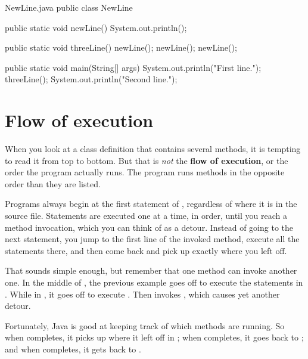 \begin{trinket}{NewLine.java}
public class NewLine {

    public static void newLine() {
        System.out.println();
    }

    public static void threeLine() {
        newLine();
        newLine();
        newLine();
    }

    public static void main(String[] args) {
        System.out.println("First line.");
        threeLine();
        System.out.println("Second line.");
    }
}
\end{trinket}


\section{Flow of execution}


When you look at a class definition that contains several methods, it is tempting to read it from top to bottom.
But that is {\em not} the {\bf flow of execution}, or the order the program actually runs.
The  program runs methods in the opposite order than they are listed.

Programs always begin at the first statement of , regardless of where it is in the source file.
Statements are executed one at a time, in order, until you reach a method invocation, which you can think of as a detour.
Instead of going to the next statement, you jump to the first line of the invoked method, execute all the statements there, and then come back and pick up exactly where you left off.

That sounds simple enough, but remember that one method can invoke another one.
In the middle of , the previous example goes off to execute the statements in .
While in , it goes off to execute .
Then  invokes , which causes yet another detour.

Fortunately, Java is good at keeping track of which methods are running.
So when  completes, it picks up where it left off in ; when  completes, it goes back to ; and when  completes, it gets back to .



